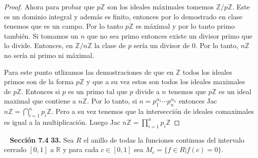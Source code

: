 \documentclass[letter,twoside,12pt]{article}
\begin{document}
\begin{enumerate}[label=\textbf{(\alph*)}]
\begin{proof}
Ahora para probar que $p\mathbb{Z}$ son los ideales m\'aximales tomemos $\mathbb{Z}/p\mathbb{Z}$. Este es un dominio integral y adem\'as es finito, entonces por lo demostrado en clase tenemos que es un campo. Por lo tanto $p\mathbb{Z}$ es m\'aximal y por lo tanto primo tambi\'en. Si tomamos un $n$ que no sea primo entonces existe un divisor primo que lo divide. Entonces, en $\mathbb{Z}/n\mathbb{Z}$ la clase de $p$ ser\'ia un divisor de 0. Por lo tanto, $n\mathbb{Z}$ no ser\'ia ni primo ni m\'aximal.  

Para este punto utlizamos las demostraciones de que en $\mathbb{Z}$ todos los ideales primos son de la forma $p\mathbb{Z}$ y que a su vez estos son todos los ideales maximales de $p\mathbb{Z}$. Entonces si $p$ es un primo tal que $p$ divide a $n$ tenemos que $p\mathbb{Z}$ es un ideal maximal que contiene a $n\mathbb{Z}$. Por lo tanto, si $n = p_1^{\alpha_1}\cdots p_n^{\alpha_n}$ entonces Jac $n\mathbb{Z}= \bigcap_{i=1}^{n} p_i\mathbb{Z}$. Pero a su vez tenemos que la intersecci\'on de ideales comaximales es igual a la multiplicaci\'on. Luego Jac $n\mathbb{Z}=\prod_{i=1}^{n} p_i\mathbb{Z}$  
\end{proof}
\end{enumerate}
\newpage
\mbox{ }
\newpage
\textbf{Secci\'on 7.4} \textbf{33.} Sea $R$ el anillo de todas la funciones continuas del intervalo cerrado $[0,1]$ a $\mathbb{R}$ y para cada $c \in [0,1]$ sea $M_c=\{f \in R|f(c)=0\}$.
\end{document}
